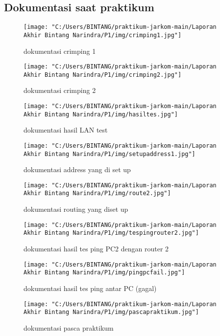 \subsection{Dokumentasi saat praktikum}
\begin{figure}[H]
	\centering
	\texttt{[image: "C:/Users/BINTANG/praktikum-jarkom-main/Laporan Akhir Bintang Narindra/P1/img/crimping1.jpg"]}
	\caption{dokumentasi crimping 1}
\end{figure}
\begin{figure}[H]
	\centering
	\texttt{[image: "C:/Users/BINTANG/praktikum-jarkom-main/Laporan Akhir Bintang Narindra/P1/img/crimping2.jpg"]}
	\caption{dokumentasi crimping 2}
\end{figure}
\begin{figure}[H]
	\centering
	\texttt{[image: "C:/Users/BINTANG/praktikum-jarkom-main/Laporan Akhir Bintang Narindra/P1/img/hasiltes.jpg"]}
	\caption{dokumentasi hasil LAN test}
\end{figure}
\begin{figure}[H]
	\centering
	\texttt{[image: "C:/Users/BINTANG/praktikum-jarkom-main/Laporan Akhir Bintang Narindra/P1/img/setupaddress1.jpg"]}
	\caption{dokumentasi address yang di set up}
\end{figure}
\begin{figure}[H]
	\centering
	\texttt{[image: "C:/Users/BINTANG/praktikum-jarkom-main/Laporan Akhir Bintang Narindra/P1/img/route2.jpg"]}
	\caption{dokumentasi routing yang diset up}
\end{figure}
\begin{figure}[H]
	\centering
	\texttt{[image: "C:/Users/BINTANG/praktikum-jarkom-main/Laporan Akhir Bintang Narindra/P1/img/tespingrouter2.jpg"]}
	\caption{dokumentasi hasil tes ping PC2 dengan router 2}
\end{figure}
\begin{figure}[H]
	\centering
	\texttt{[image: "C:/Users/BINTANG/praktikum-jarkom-main/Laporan Akhir Bintang Narindra/P1/img/pingpcfail.jpg"]}
	\caption{dokumentasi hasil tes ping antar PC (gagal)}
\end{figure}
\begin{figure}[H]
	\centering
	\texttt{[image: "C:/Users/BINTANG/praktikum-jarkom-main/Laporan Akhir Bintang Narindra/P1/img/pascapraktikum.jpg"]}
	\caption{dokumentasi pasca praktikum}
\end{figure}
